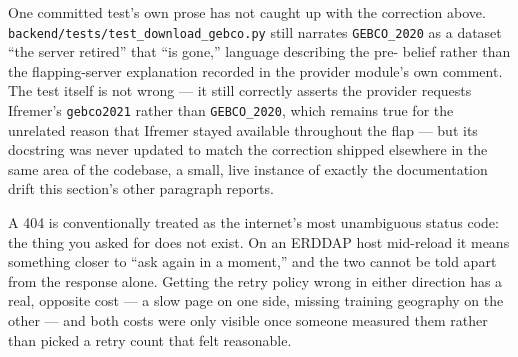  One committed test's own prose has not caught up
with the correction above. \texttt{backend/tests/test\_download\_gebco.py}
still narrates \texttt{GEBCO\_2020} as a dataset ``the server retired'' that
``is gone,'' language describing the pre-\GebcoReprobeDate{} belief rather
than the flapping-server explanation recorded in the provider module's own
comment. The test itself is not wrong --- it still correctly asserts the
provider requests Ifremer's \texttt{gebco2021} rather than
\texttt{GEBCO\_2020}, which remains true for the unrelated reason that
Ifremer stayed available throughout the flap --- but its docstring was never
updated to match the correction shipped elsewhere in the same area of the
codebase, a small, live instance of exactly the documentation drift this
section's other paragraph reports.

 A 404 is conventionally treated as the internet's most
unambiguous status code: the thing you asked for does not exist. On an
ERDDAP host mid-reload it means something closer to ``ask again in a
moment,'' and the two cannot be told apart from the response alone. Getting
the retry policy wrong in either direction has a real, opposite cost --- a
slow page on one side, missing training geography on the other --- and both
costs were only visible once someone measured them rather than picked a
retry count that felt reasonable.

